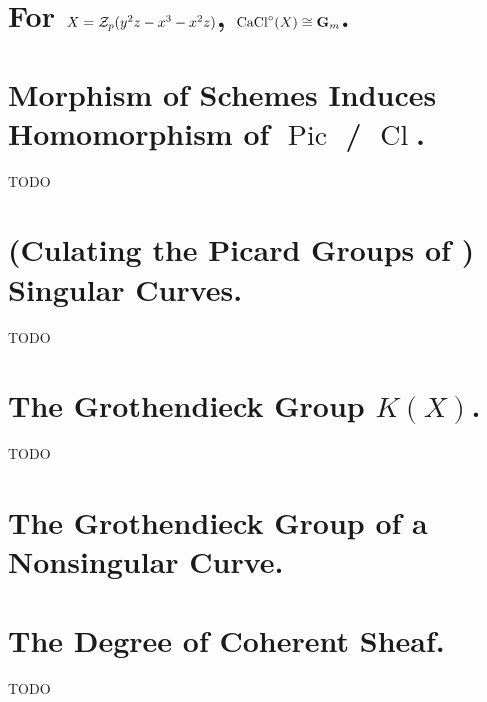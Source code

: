 \documentclass[a4paper]{jsarticle}
\newcommand{\Cl}{\operatorname{Cl}}
\newcommand{\nullCaCl}{\operatorname{CaCl}^{\circ}}
\newcommand{\Pic}{\operatorname{Pic}}
\begin{document}
\section{For $X=\mathcal{Z}_p(y^2z-x^3-x^2z)$, $\nullCaCl(X) \iso \mathbf{G}_m$.} %

\section{Morphism of Schemes Induces Homomorphism of $\Pic$ / $\Cl$.} %
TODO

\section{(Culating the Picard Groups of ) Singular Curves.} %
TODO

\section{The Grothendieck Group $K(X)$.} %
TODO

\section{The Grothendieck Group of a Nonsingular Curve.} %

\section{The Degree of Coherent Sheaf.} %
TODO
\end{document}
